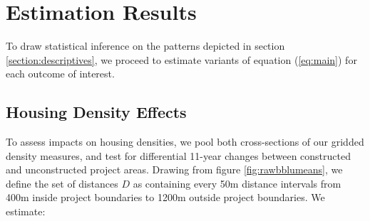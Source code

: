 \documentclass[12pt]{article}
\begin{document}



\section{Estimation Results}\label{section:results}

To draw statistical inference on the patterns depicted in section \ref{section:descriptives}, we proceed to estimate variants of equation (\ref{eq:main}) for each outcome of interest. 






\subsection{Housing Density Effects}\label{section:bbluestimates}

To assess impacts on housing densities, we pool both cross-sections of our gridded density measures, and test for differential 11-year changes between constructed and unconstructed project areas. Drawing from figure \ref{fig:rawbblumeans}, we define the set of distances $D$ as containing every 50m distance intervals from 400m inside project boundaries to 1200m outside project boundaries. We estimate: 
\end{document}
